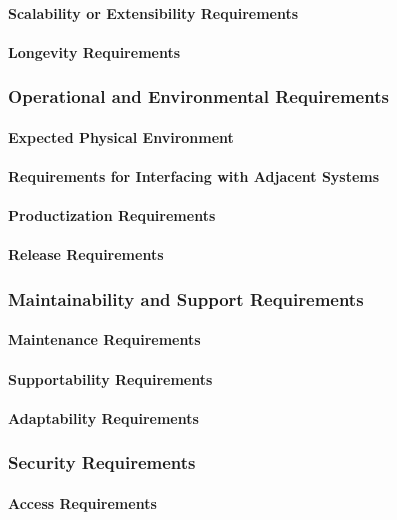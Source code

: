 \documentclass[12pt]{article}
\begin{document}
\paragraph{Scalability or Extensibility Requirements}
\paragraph{Longevity Requirements}


\subsubsection{Operational and Environmental Requirements}
\paragraph{Expected Physical Environment}
\paragraph{Requirements for Interfacing with Adjacent Systems}
\paragraph{Productization Requirements}
\paragraph{Release Requirements}


\subsubsection{Maintainability and Support Requirements}
\paragraph{Maintenance Requirements}
\paragraph{Supportability Requirements}
\paragraph{Adaptability Requirements}


\subsubsection{Security Requirements}
\paragraph{Access Requirements}
\end{document}
